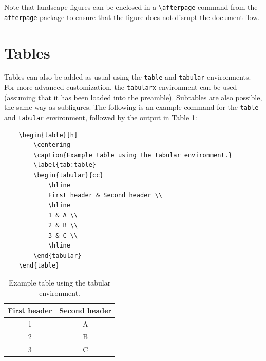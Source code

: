 \documentclass{umalayathesis}
\begin{document}
Note that landscape figures can be enclosed in a \verb|\afterpage| command from the \texttt{afterpage} package to ensure that the figure does not disrupt the document flow.

\section{Tables}

Tables can also be added as usual using the \texttt{table} and \texttt{tabular} environments. For more advanced customization, the \texttt{tabularx} environment can be used (assuming that it has been loaded into the preamble). Subtables are also possible, the same way as subfigures. The following is an example command for the \texttt{table} and \texttt{tabular} environment, followed by the output in Table \ref{tab:table}:
\begin{verbatim}
    \begin{table}[h]
        \centering
        \caption{Example table using the tabular environment.}
        \label{tab:table}
        \begin{tabular}{cc}
            \hline
            First header & Second header \\
            \hline
            1 & A \\
            2 & B \\
            3 & C \\
            \hline
        \end{tabular}
    \end{table}
\end{verbatim}

\begin{table}[h]
    \centering
    \caption{Example table using the tabular environment.}
    \label{tab:table}
    \begin{tabular}{cc}
        \hline
        First header & Second header \\
        \hline
        1 & A \\
        2 & B \\
        3 & C \\
        \hline
    \end{tabular}
\end{table}
\end{document}
